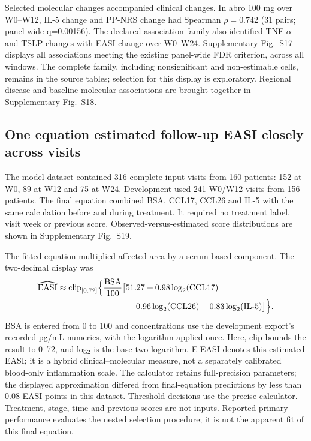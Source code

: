 \documentclass[10pt,a4paper]{article}
\begin{document}
Selected molecular changes accompanied clinical changes. In abro 100 mg over W0--W12, IL-5 change and PP-NRS change had Spearman $\rho=0.742$ (31 pairs; panel-wide q=0.00156). The declared association family also identified TNF-$\alpha$ and TSLP changes with EASI change over W0--W24. Supplementary Fig.~S17 displays all associations meeting the existing panel-wide FDR criterion, across all windows. The complete family, including nonsignificant and non-estimable cells, remains in the source tables; selection for this display is exploratory. Regional disease and baseline molecular associations are brought together in Supplementary Fig.~S18.

\subsection{One equation estimated follow-up EASI closely across visits}
The model dataset contained 316 complete-input visits from 160 patients: 152 at W0, 89 at W12 and 75 at W24. Development used 241 W0/W12 visits from 156 patients. The final equation combined BSA, CCL17, CCL26 and IL-5 with the same calculation before and during treatment. It required no treatment label, visit week or previous score. Observed-versus-estimated score distributions are shown in Supplementary Fig.~S19.

The fitted equation multiplied affected area by a serum-based component. The two-decimal display was
\begin{equation}
\begin{aligned}
\widehat{\mathrm{EASI}} \approx
\operatorname{clip}_{[0,72]}\Bigl\{\frac{\mathrm{BSA}}{100}
\bigl[&51.27+0.98\log_2(\mathrm{CCL17})\\
&+0.96\log_2(\mathrm{CCL26})
-0.83\log_2(\mathrm{IL\mbox{-}5})\bigr]\Bigr\}.
\end{aligned}
\label{eq:common}
\end{equation}
BSA is entered from 0 to 100 and concentrations use the development export's recorded pg/mL numerics, with the logarithm applied once. Here, clip bounds the result to 0--72, and log$_2$ is the base-two logarithm. E-EASI denotes this estimated EASI; it is a hybrid clinical--molecular measure, not a separately calibrated blood-only inflammation scale. The calculator retains full-precision parameters; the displayed approximation differed from final-equation predictions by less than 0.08 EASI points in this dataset. Threshold decisions use the precise calculator. Treatment, stage, time and previous scores are not inputs. Reported primary performance evaluates the nested selection procedure; it is not the apparent fit of this final equation.
\end{document}

